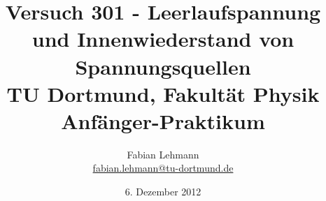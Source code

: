 

\renewcommand*\rmdefault{iwona}\normalfont\upshape


\title{Versuch 301 - Leerlaufspannung und Innenwiederstand von Spannungsquellen\\				%
\large TU Dortmund, Fakultät Physik\\ 
\normalsize Anfänger-Praktikum}


\author{Fabian Lehmann\\					%
{\small \href{fabian.lehmann@tu-dortmund.de}{fabian.lehmann@tu-dortmund.de}}		%
}

\date{6. Dezember 2012}				%





\maketitle					%
\thispagestyle{empty} 				%



